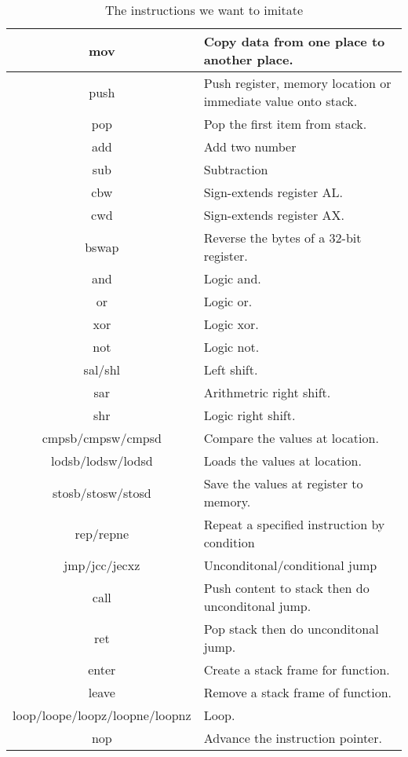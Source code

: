 \documentclass[12pt]{extarticle}
\begin{document}
\begin{table}[h!]
    \centering
    \begin{tabular}{||c | p{9cm}||} 
     \hline
     mov & Copy data from one place to another place. \\ [0.5ex] 
     \hline
     push & Push register, memory location or immediate value onto stack.  \\ 
     \hline
     pop & Pop the first item from stack. \\
     \hline
     add & Add two number \\
     \hline
     sub &  Subtraction \\
     \hline
     cbw & Sign-extends register AL. \\
     \hline
     cwd & Sign-extends register AX. \\
     \hline
     bswap & Reverse the bytes of a 32-bit register. \\
     \hline
     and & Logic and. \\
     \hline
     or & Logic or. \\
     \hline
     xor & Logic xor. \\
     \hline
     not & Logic not. \\
     \hline
     sal/shl & Left shift. \\
     \hline
     sar & Arithmetric right shift. \\
     \hline
     shr & Logic right shift. \\
     \hline
     cmpsb/cmpsw/cmpsd & Compare the values at location. \\
     \hline
     lodsb/lodsw/lodsd & Loads the values at location. \\
     \hline
     stosb/stosw/stosd & Save the values at register to memory. \\
     \hline
     rep/repne & Repeat a specified instruction by condition \\
     \hline
     jmp/jcc/jecxz & Unconditonal/conditional jump \\
     \hline
     call & Push content to stack then do unconditonal jump.\\
     \hline
     ret & Pop stack then do unconditonal jump.\\
     \hline
     enter & Create a stack frame for function.\\
     \hline
     leave & Remove a stack frame of function.\\
     \hline
     loop/loope/loopz/loopne/loopnz & Loop.\\
     \hline
     nop & Advance the instruction pointer.\\
     \hline
    \end{tabular}
    \caption{The instructions we want to imitate}
    \label{table:2}
\end{table}
\pagebreak
\end{document}
